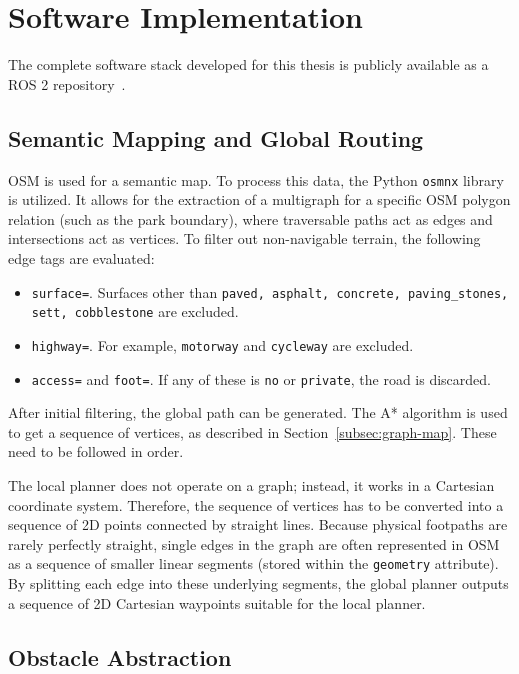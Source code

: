 \section{Software Implementation}
\label{sec:software-implementation}

The complete software stack developed for this thesis is publicly available as a ROS 2 repository~\cite{husiev2026husky}.

\subsection{Semantic Mapping and Global Routing}
\label{subsec:semantic-mapping-routing}

OSM is used for a semantic map. To process this data, the Python \texttt{osmnx} library~\cite{boeing2017osmnx} is utilized. It allows for the extraction of a multigraph for a specific OSM polygon relation (such as the park boundary), where traversable paths act as edges and intersections act as vertices. To filter out non-navigable terrain, the following edge tags are evaluated:
\begin{itemize}
    \item \texttt{surface=}. Surfaces other than \texttt{paved, asphalt, concrete, paving\_stones, sett, cobblestone} are excluded.
    \item \texttt{highway=}. For example, \texttt{motorway} and \texttt{cycleway} are excluded.
    \item \texttt{access=} and \texttt{foot=}. If any of these is \texttt{no} or \texttt{private}, the road is discarded.
\end{itemize}

After initial filtering, the global path can be generated. The A* algorithm is used to get a sequence of vertices, as described in Section~\ref{subsec:graph-map}. These need to be followed in order.

The local planner does not operate on a graph; instead, it works in a Cartesian coordinate system. Therefore, the sequence of vertices has to be converted into a sequence of 2D points connected by straight lines. Because physical footpaths are rarely perfectly straight, single edges in the graph are often represented in OSM as a sequence of smaller linear segments (stored within the \texttt{geometry} attribute). By splitting each edge into these underlying segments, the global planner outputs a sequence of 2D Cartesian waypoints suitable for the local planner.

\subsection{Obstacle Abstraction}
\label{subsec:obstacle-abstraction-impl}

